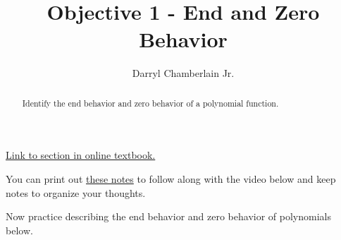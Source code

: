 \documentclass{ximera}
\author{Darryl Chamberlain Jr.}
\title{Objective 1 - End and Zero Behavior}
\begin{document}
\begin{abstract}
Identify the end behavior and zero behavior of a polynomial function.
\end{abstract}
\maketitle

\href{https://cnx.org/contents/mwjClAV_@8.1:ZE9qk3Qp@12/Graphs-of-Polynomial-Functions}{Link to section in online textbook.}


You can print out \href{http://people.clas.ufl.edu/dchamberlain31/files/M6-Objective-1-End-and-Zero-Behavior.pdf}{these notes} to follow along with the video below and keep notes to organize your thoughts.


Now practice describing the end behavior and zero behavior of polynomials below. 
\end{document}
